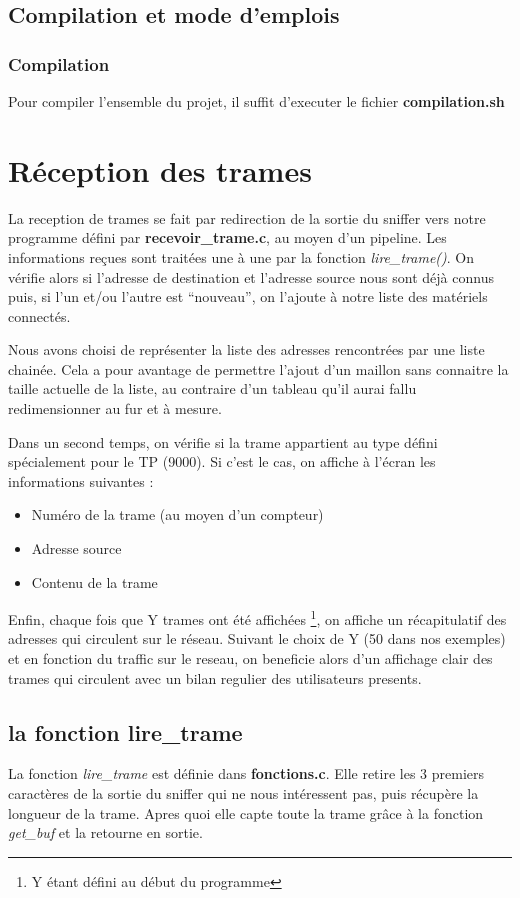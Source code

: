 \documentclass[a4paper,11pt]{article}
\begin{document}
	\subsection{Compilation et mode d'emplois}
		\subsubsection{Compilation}
		Pour compiler l'ensemble du projet, il suffit d'executer le fichier \textbf{compilation.sh}
	\section{Réception des trames}
	La reception de trames se fait par redirection de la sortie du sniffer vers notre programme défini par \textbf{recevoir\_trame.c}, au moyen d'un pipeline.
	Les informations reçues sont traitées une à une par la fonction \textit{lire\_trame()}. On vérifie alors si l'adresse de destination et l'adresse source nous sont déjà connus puis, si l'un et/ou l'autre est ``nouveau'', on l'ajoute à notre liste des matériels connectés.

	Nous avons choisi de représenter la liste des adresses rencontrées par une liste chainée. Cela a pour avantage de permettre l'ajout d'un maillon sans connaitre la taille actuelle de la liste, au contraire d'un tableau qu'il aurai fallu redimensionner au fur et à mesure.
	
	Dans un second temps, on vérifie si la trame appartient au type défini spécialement pour le TP (9000). Si c'est le cas, on affiche à l'écran les informations suivantes :
	\begin{itemize}
		\item Numéro de la trame (au moyen d'un compteur)
		\item Adresse source
		\item Contenu de la trame
	\end{itemize}

	Enfin, chaque fois que Y trames ont été affichées \footnote{Y étant défini au début du programme}, on affiche un récapitulatif des adresses qui circulent sur le réseau. Suivant le choix de Y (50 dans nos exemples) et en fonction du traffic sur le reseau, on beneficie alors d'un affichage clair des trames qui circulent avec un bilan regulier des utilisateurs presents. %
	\subsection{la fonction lire\_trame}
	La fonction \textit{lire\_trame} est définie dans \textbf{fonctions.c}. Elle retire les 3 premiers caractères de la sortie du sniffer qui ne nous intéressent pas, puis récupère la longueur de la trame. Apres quoi elle capte toute la trame grâce à la fonction \textit{get\_buf} et la retourne en sortie.
\end{document}
